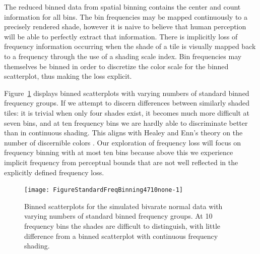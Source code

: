 \documentclass[11pt]{isuthesis}\usepackage[]{graphicx}\usepackage[]{color}
\newenvironment{knitrout}{}{} %
\begin{document}
The reduced binned data from spatial binning contains the center and count information for all bins. The bin frequencies may be mapped continuously to a precisely rendered shade, however it is naive to believe that human perception will be able to perfectly extract that information. There is implicitly loss of frequency information occurring when the shade of a tile is visually mapped back to a frequency through the use of a shading scale index. Bin frequencies may themselves be binned in order to discretize the color scale for the binned scatterplot, thus making the loss explicit.

Figure~\ref{fig:StandardFreqBinning4710none} displays binned scatterplots with varying numbers of  standard binned frequency groups. If we attempt to discern differences between similarly shaded tiles: it is trivial when only four shades exist, it becomes much more difficult at seven bins, and at ten frequency bins we are hardly able to discriminate better than in continuous shading. This aligns with Healey and Enn's theory on the number of discernible colors \citep{colorperception}. Our exploration of frequency loss will focus on frequency binning with at most ten bins because above this we experience implicit frequency from perceptual bounds that are not well reflected in the explicitly defined frequency loss. 

\begin{knitrout}
\color{fgcolor}\begin{figure}[H]

{\centering \texttt{[image: FigureStandardFreqBinning4710none-1]} 

}

\caption[Binned scatterplots for the simulated bivarate normal data with varying numbers of standard binned frequency groups]{Binned scatterplots for the simulated bivarate normal data with varying numbers of standard binned frequency groups. At 10 frequency bins the shades are difficult to distinguish, with little difference from a binned scatterplot with continuous frequency shading.}\label{fig:StandardFreqBinning4710none}
\end{figure}


\end{knitrout}
\end{document}
